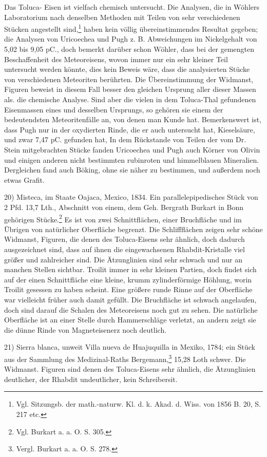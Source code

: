 \documentclass[a4paper, 11pt, oneside]{article}
\begin{document}
Das Toluca- Eisen ist vielfach chemisch untersucht. Die Analysen, die in Wöhlers Laboratorium nach denselben Methoden mit Teilen von sehr verschiedenen Stücken angestellt sind,\footnote{Vgl. Sitzungsb. der math.-naturw. Kl. d. k. Akad. d. Wiss. von 1856 B. 20, S. 217 etc.} haben kein völlig übereinstimmendes Resultat gegeben; die Analysen von Uricoechea und Pugh z. B. Abweichungen im Nickelgehalt von 5,02 bis 9,05 pC., doch bemerkt darüber schon Wöhler, dass bei der gemengten Beschaffenheit des Meteoreisens, wovon immer nur ein sehr kleiner Teil untersucht werden könnte, dies kein Beweis wäre, dass die analysierten Stücke von verschiedenen Meteoriten berührten. Die Übereinstimmung der Widmanst, Figuren beweist in diesem Fall besser den gleichen Ursprung aller dieser Massen als. die chemische Analyse. Sind aber die vielen in dem Toluca-Thal gefundenen Eisenmassen eines und desselben Ursprungs, so gehören sie einem der bedeutendsten Meteoritenfälle an, von denen man Kunde hat. Bemerkenswert ist, dass Pugh nur in der oxydierten Rinde, die er auch untersucht hat, Kieselsäure, und zwar 7,47 pC. gefunden hat, In dem Rückstande von Teilen der vom Dr. Stein mitgebrachten Stücke fanden Uricoechea und Pugh auch Körner von Olivin und einigen anderen nicht bestimmten rubinroten und himmelblauen Mineralien. Dergleichen fand auch Böking, ohne sie näher zu bestimmen, und außerdem noch etwas Grafit.

20) Misteca, im Staate Oajaca, Mexico, 1834. Ein parallelepipedisches Stück von 2 Pfd. 13,7 Lth., Abschnitt von einem, dem Geh. Bergrath Burkart in Bonn gehörigen Stücke.\footnote{Vgl. Burkart a. a. O. S. 305.} Es ist von zwei Schnittflächen, einer Bruchfläche und im Übrigen von natürlicher Oberfläche begrenzt. Die Schliffflächen zeigen sehr schöne Widmanst, Figuren, die denen des Toluca-Eisens sehr ähnlich, doch dadurch ausgezeichnet sind, dass auf ihnen die eingewachsenen Rhabdit-Kristalle viel größer und zahlreicher sind. Die Ätzunglinien sind sehr schwach und nur an manchen Stellen sichtbar. Troilit immer in sehr kleinen Partien, doch findet sich auf der einen Schnittfläche eine kleine, krumm zylinderförmige Höhlung, worin Troilit gesessen zu haben scheint. Eine größere runde Rinne auf der Oberfläche war vielleicht früher auch damit gefüllt. Die Bruchfläche ist schwach angelaufen, doch sind darauf die Schalen des Meteoreisens noch gut zu sehen. Die natürliche Oberfläche ist an einer Stelle durch Hammerschläge verletzt, an andern zeigt sie die dünne Rinde von Magneteisenerz noch deutlich.

21) Sierra blanca, unweit Villa nueva de Huajuquilla in Mexiko, 1784; ein Stück aus der Sammlung des Medizinal-Raths Bergemann,\footnote{Vergl. Burkart a. a. O. S. 278.} 15,28 Loth schwer. Die Widmanst. Figuren sind denen des Toluca-Eisens sehr ähnlich, die Ätzunglinien deutlicher, der Rhabdit undeutlicher, kein Schreibersit.
\end{document}
